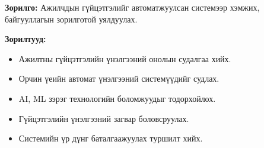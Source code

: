 \textbf{Зорилго:} Ажилчдын гүйцэтгэлийг автоматжуулсан системээр хэмжих, байгууллагын зорилготой уялдуулах.

\textbf{Зорилтууд:}
\begin{itemize}
    \item Ажилтны гүйцэтгэлийн үнэлгээний онолын судалгаа хийх.
    \item Орчин үеийн автомат үнэлгээний системүүдийг судлах.
    \item AI, ML зэрэг технологийн боломжуудыг тодорхойлох.
    \item Гүйцэтгэлийн үнэлгээний загвар боловсруулах.
    \item Системийн үр дүнг баталгаажуулах туршилт хийх.
\end{itemize}

